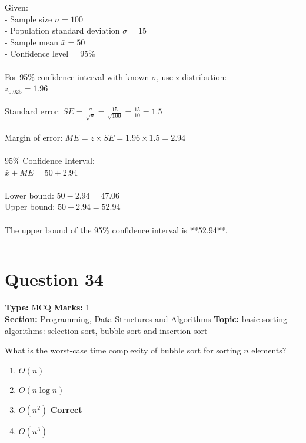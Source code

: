 \documentclass[11pt]{article}
\begin{document}
Given: \\
- Sample size \(n = 100\) \\
- Population standard deviation \(\sigma = 15\) \\
- Sample mean \(\bar{x} = 50\) \\
- Confidence level = 95\% \\
\\
For 95\% confidence interval with known \(\sigma\), use z-distribution: \\
\(z_{0.025} = 1.96\) \\
\\
Standard error: \(SE = \frac{\sigma}{\sqrt{n}} = \frac{15}{\sqrt{100}} = \frac{15}{10} = 1.5\) \\
\\
Margin of error: \(ME = z \times SE = 1.96 \times 1.5 = 2.94\) \\
\\
95\% Confidence Interval: \\
\(\bar{x} \pm ME = 50 \pm 2.94\) \\
\\
Lower bound: \(50 - 2.94 = 47.06\) \\
Upper bound: \(50 + 2.94 = 52.94\) \\
\\
The upper bound of the 95\% confidence interval is **52.94**.

\vspace{0.8em}
\hrule
\vspace{0.4em}
\section*{Question 34}
\textbf{Type:} MCQ \hfill \textbf{Marks:} 1\\
\textbf{Section:} Programming, Data Structures and Algorithms \hfill \textbf{Topic:} basic sorting algorithms: selection sort, bubble sort and insertion sort

What is the worst-case time complexity of bubble sort for sorting \(n\) elements?


\begin{enumerate}[label=\textbf{\Alph*.}, leftmargin=1.8em]
\item \(O(n)\)\item \(O(n \log n)\)\item \(O(n^2)\) \hfill {\color{gategreen}\textbf{Correct}}\item \(O(n^3)\)\end{enumerate}
\end{document}
